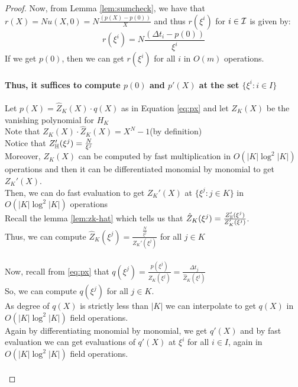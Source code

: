 \begin{proof}
    Now, from Lemma \ref{lem:sumcheck}, we have that $r(X)=N u(X,0)=N \frac{(p(X) - p(0))}{X}$ and thus $r(\xi^i)$ for $i\in \mathcal{I}$ is given by:
    $$r(\xi^i)=N \frac{(\Delta t_i - p(0))}{\xi^i}$$
    If we get $p(0)$, then we can get $r(\xi^i)$ for all $i$ in $O(m)$ operations.\\\\
    \textbf{Thus, it suffices to compute $p(0)$ and $p'(X)$ at the set $\{\xi^i:i \in I\}$}\\\\

    Let $p(X)=\widehat{Z}_K(X)\cdot q(X)$
    as in Equation \eqref{eq:px} and let $Z_K(X)$ be the vanishing polynomial for $H_K$\\
    Note that $Z_K(X) \cdot \hat{Z}_K(X)=X^N-1$(by definition)\\

    Notice that $Z_{\mathbb{H}}'(\xi^j)= \frac{N}{\xi^j} $\\
    Moreover, $Z_K(X)$ can be computed by fast multiplication in $O(|K|\log^2 |K|)$ operations and then it can be differentiated monomial by monomial to get $Z_K'(X)$. \\
    Then, we can do fast evaluation to get $Z_K'(X)$ at $\{\xi^j:j\in K\}$ in $O(|K|\log^2 |K|)$ operations\\
    Recall the lemma \ref{lem:zk-hat} which tells us that $\hat{Z}_K(\xi^j)=\frac{Z_{\mathbb{H}}'(\xi^j)}{Z_K'(\xi^j)}$.\\
    Thus, we can compute $\hat{Z}_K(\xi^j)=\frac{\frac{N}{\xi^j}}{Z_K'(\xi^j)}$ for all $j \in K$\\\\
    Now, recall from \eqref{eq:px} that $q(\xi^j)=\frac{p(\xi^j)}{\hat{Z}_K(\xi^j)}=\frac{\Delta t_j}{\widehat{Z}_K(\xi^j)}$\\
    So, we can compute $q(\xi^j)$ for all $j \in K$. \\
    As degree of $q(X)$ is strictly less than $|K|$ we can interpolate to get $q(X)$ in $O(|K|\log^2 |K|)$ field operations. \\
    Again by differentiating monomial by monomial, we get $q'(X)$ and by fast evaluation we can get evaluations of $q'(X)$ at $\xi^i$ for all $i \in I$, again in $O(|K|\log^2 |K|)$ field operations.\\\\


\end{proof}
